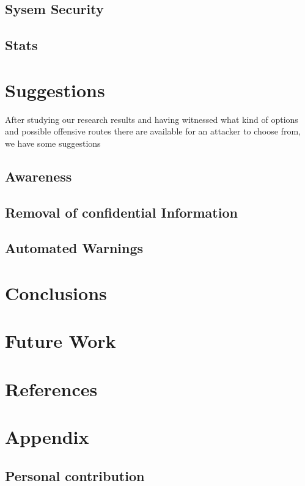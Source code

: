 \documentclass[12pt]{article}
\begin{document}
\subsection{Sysem Security}

\subsection{Stats}

\section{Suggestions}

 After studying our research results and having witnessed what kind of options and possible offensive routes there are available for an attacker to choose from, we have some suggestions

\subsection{Awareness}

\subsection{Removal of confidential Information}

\subsection{Automated Warnings}

\section{Conclusions}

\section{Future Work}

\section{References}

\section{Appendix}

\subsection{Personal contribution}
\end{document}
